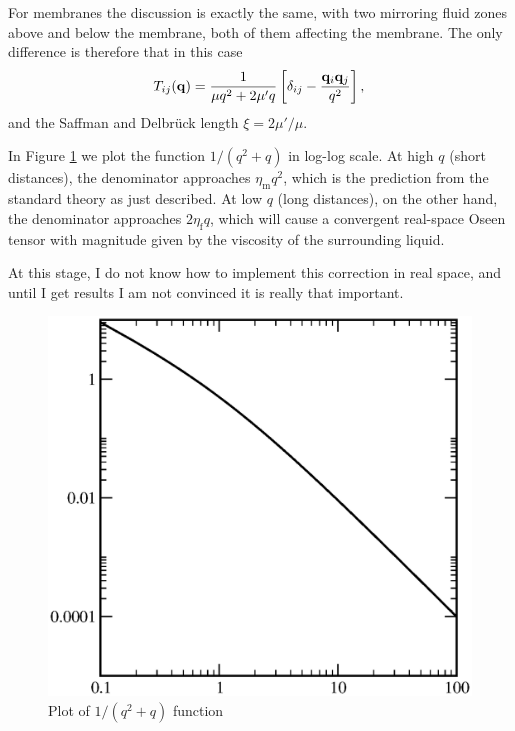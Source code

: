 For membranes the discussion is exactly the same, with two mirroring
fluid zones above and below the membrane, both of them affecting the
membrane. The only difference is therefore that in this case
\[
T_{ij}(\mathbf{q}) = \frac 1{\mu q^2 +  2 \mu' q  } \left[
  \delta_{ij} - \frac{ \mathbf{q}_i  \mathbf{q}_j}{q^2} 
\right],
\]
and the Saffman and Delbr{\"u}ck length $\xi = 2 \mu'/\mu$.




In Figure \ref{fig:SD} we plot the function $1/(q^2+q)$ in log-log
scale.  At high $q$ (short distances), the denominator approaches
\( \eta_\mathrm{m} q^2 \),
which is the prediction from the standard theory as just described. At
low $q$ (long distances), on the other hand, the denominator
approaches \( 2 \eta_\mathrm{f} q \),
which will cause a convergent real-space Oseen tensor with magnitude
given by the viscosity of the surrounding liquid.

At this stage, I do not know how to implement this correction in real
space, and until I get results I am not convinced it is really that
important.

\begin{figure}
  \centering
  \begin{minipage}{0.45\textwidth}
      \includegraphics[width=\textwidth]{figures/SD}
  \end{minipage}
  \caption{Plot of $1/(q^2+q)$ function
    \label{fig:SD}}
\end{figure}

